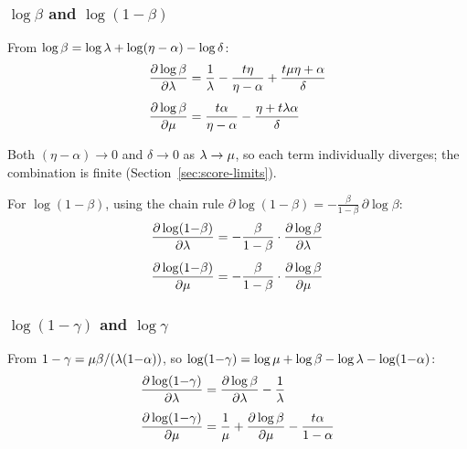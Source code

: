 \subsubsection{\texorpdfstring{$\log\beta$ and $\log(1{-}\beta)$}{log beta and log(1-beta)}}

From $\log\beta = \log\lambda + \log(\eta - \alpha) - \log\delta$:
\begin{align}
\frac{\partial\log\beta}{\partial\lambda}
  &= \frac{1}{\lambda}
     - \frac{t\eta}{\eta - \alpha}
     + \frac{t\mu\eta + \alpha}{\delta}
\label{eq:dlogbeta-dl}
\\[4pt]
\frac{\partial\log\beta}{\partial\mu}
  &= \frac{t\alpha}{\eta - \alpha}
     - \frac{\eta + t\lambda\alpha}{\delta}
\label{eq:dlogbeta-dm}
\end{align}

Both $(\eta - \alpha) \to 0$ and $\delta \to 0$ as $\lambda \to \mu$,
so each term individually diverges; the combination is finite
(Section~\ref{sec:score-limits}).

For $\log(1{-}\beta)$, using the chain rule
$\partial\log(1{-}\beta) = -\frac{\beta}{1-\beta}\,\partial\log\beta$:
\begin{align}
\frac{\partial\log(1{-}\beta)}{\partial\lambda}
  &= -\frac{\beta}{1-\beta}
     \cdot\frac{\partial\log\beta}{\partial\lambda}
\label{eq:dlog1mbeta-dl}
\\[4pt]
\frac{\partial\log(1{-}\beta)}{\partial\mu}
  &= -\frac{\beta}{1-\beta}
     \cdot\frac{\partial\log\beta}{\partial\mu}
\label{eq:dlog1mbeta-dm}
\end{align}

\subsubsection{\texorpdfstring{$\log(1{-}\gamma)$ and $\log\gamma$}{log(1-gamma) and log gamma}}

From $1 - \gamma = \mu\beta/(\lambda(1{-}\alpha))$,
so $\log(1{-}\gamma) = \log\mu + \log\beta - \log\lambda - \log(1{-}\alpha)$:
\begin{align}
\frac{\partial\log(1{-}\gamma)}{\partial\lambda}
  &= \frac{\partial\log\beta}{\partial\lambda} - \frac{1}{\lambda}
\label{eq:dlog1mgamma-dl}
\\[4pt]
\frac{\partial\log(1{-}\gamma)}{\partial\mu}
  &= \frac{1}{\mu}
     + \frac{\partial\log\beta}{\partial\mu}
     - \frac{t\alpha}{1-\alpha}
\label{eq:dlog1mgamma-dm}
\end{align}

